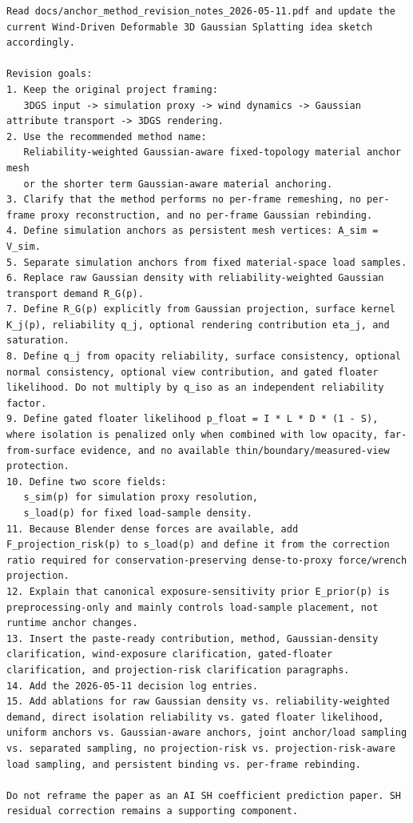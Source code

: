 \documentclass[11pt,a4paper]{article}
\begin{document}
\begin{lstlisting}
Read docs/anchor_method_revision_notes_2026-05-11.pdf and update the current Wind-Driven Deformable 3D Gaussian Splatting idea sketch accordingly.

Revision goals:
1. Keep the original project framing:
   3DGS input -> simulation proxy -> wind dynamics -> Gaussian attribute transport -> 3DGS rendering.
2. Use the recommended method name:
   Reliability-weighted Gaussian-aware fixed-topology material anchor mesh
   or the shorter term Gaussian-aware material anchoring.
3. Clarify that the method performs no per-frame remeshing, no per-frame proxy reconstruction, and no per-frame Gaussian rebinding.
4. Define simulation anchors as persistent mesh vertices: A_sim = V_sim.
5. Separate simulation anchors from fixed material-space load samples.
6. Replace raw Gaussian density with reliability-weighted Gaussian transport demand R_G(p).
7. Define R_G(p) explicitly from Gaussian projection, surface kernel K_j(p), reliability q_j, optional rendering contribution eta_j, and saturation.
8. Define q_j from opacity reliability, surface consistency, optional normal consistency, optional view contribution, and gated floater likelihood. Do not multiply by q_iso as an independent reliability factor.
9. Define gated floater likelihood p_float = I * L * D * (1 - S), where isolation is penalized only when combined with low opacity, far-from-surface evidence, and no available thin/boundary/measured-view protection.
10. Define two score fields:
   s_sim(p) for simulation proxy resolution,
   s_load(p) for fixed load-sample density.
11. Because Blender dense forces are available, add F_projection_risk(p) to s_load(p) and define it from the correction ratio required for conservation-preserving dense-to-proxy force/wrench projection.
12. Explain that canonical exposure-sensitivity prior E_prior(p) is preprocessing-only and mainly controls load-sample placement, not runtime anchor changes.
13. Insert the paste-ready contribution, method, Gaussian-density clarification, wind-exposure clarification, gated-floater clarification, and projection-risk clarification paragraphs.
14. Add the 2026-05-11 decision log entries.
15. Add ablations for raw Gaussian density vs. reliability-weighted demand, direct isolation reliability vs. gated floater likelihood, uniform anchors vs. Gaussian-aware anchors, joint anchor/load sampling vs. separated sampling, no projection-risk vs. projection-risk-aware load sampling, and persistent binding vs. per-frame rebinding.

Do not reframe the paper as an AI SH coefficient prediction paper. SH residual correction remains a supporting component.
\end{lstlisting}
\end{document}
